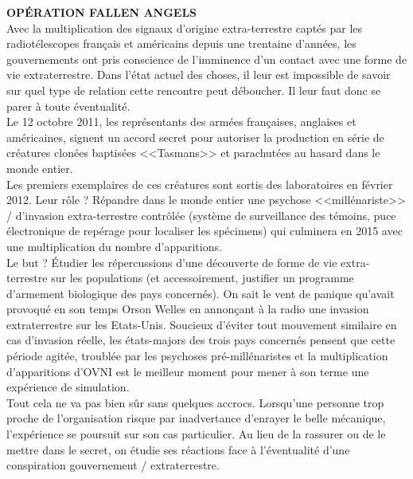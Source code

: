 \documentclass[11pt,twoside,a4paper]{article}
\begin{document}

\textbf{\Large OP{\'E}RATION FALLEN ANGELS}~\\

Avec la multiplication des signaux d'origine extra-terrestre capt{\'e}s par les radiot{\'e}lescopes fran\c{c}ais et am{\'e}ricains depuis une trentaine d'ann{\'e}es, les gouvernements ont pris conscience de l'imminence d'un contact avec une forme de vie extraterrestre. Dans l'{\'e}tat actuel des choses, il leur est impossible de savoir sur quel type de relation cette rencontre peut d{\'e}boucher. Il leur faut donc se parer {\`a} toute {\'e}ventualit{\'e}. ~\\

Le 12 octobre 2011, les repr{\'e}sentants des arm{\'e}es fran\c{c}aises, anglaises et am{\'e}ricaines, signent un accord secret pour autoriser la production en s{\'e}rie de cr{\'e}atures clon{\'e}es baptis{\'e}es <<Tasmans>> et parachut{\'e}es au hasard dans le monde entier. ~\\

Les premiers exemplaires de ces cr{\'e}atures sont sortis des laboratoires en f{\'e}vrier 2012. Leur r{\^o}le ? R{\'e}pandre dans le monde entier une psychose <<mill{\'e}nariste>> / d'invasion extra-terrestre contr{\^o}l{\'e}e (syst{\`e}me de surveillance des t{\'e}moins, puce {\'e}lectronique de rep{\'e}rage pour localiser les sp{\'e}cimens) qui culminera en 2015 avec une multiplication du nombre d'apparitions. ~\\

Le but ? {\'E}tudier les r{\'e}percussions d'une d{\'e}couverte de forme de vie extra-terrestre sur les populations (et accessoirement, justifier un programme d'armement biologique des pays concern{\'e}s). On sait le vent de panique qu'avait provoqu{\'e} en son temps Orson Welles en annon\c{c}ant {\`a} la radio une invasion extraterrestre sur les Etats-Unis. Soucieux d'{\'e}viter tout mouvement similaire en cas d'invasion r{\'e}elle, les {\'e}tats-majors des trois pays concern{\'e}s pensent que cette p{\'e}riode agit{\'e}e, troubl{\'e}e par les psychoses pr{\'e}-mill{\'e}naristes et la multiplication d'apparitions d'OVNI est le meilleur moment pour mener {\`a} son terme une exp{\'e}rience de simulation. ~\\

Tout cela ne va pas bien s{\^u}r sans quelques accrocs. Lorsqu'une personne trop proche de l'organisation risque par inadvertance d'enrayer le belle m{\'e}canique, l'exp{\'e}rience se poursuit sur son cas particulier. Au lieu de la rassurer ou de le mettre dans le secret, on {\'e}tudie ses r{\'e}actions face {\`a} l'{\'e}ventualit{\'e} d'une conspiration gouvernement / extraterrestre. ~\\
\end{document}
